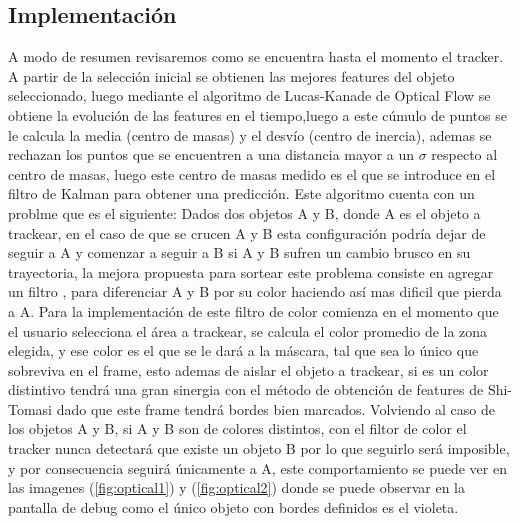 \subsection{Implementación}
 A modo de resumen revisaremos como se encuentra hasta el momento el tracker. A partir de la selección inicial se obtienen las mejores features del objeto seleccionado, luego mediante el algoritmo de Lucas-Kanade de Optical Flow se obtiene la evolución de las features en el tiempo,luego a este cúmulo de puntos se le calcula la media (centro de masas) y el desvío (centro de inercia), ademas se rechazan los puntos que se encuentren a una distancia mayor a un $\sigma$ respecto al centro de masas, luego este centro de masas medido es el que se introduce en el filtro de Kalman para obtener una predicción.
Este algoritmo cuenta con un problme que es el siguiente: Dados dos objetos A y B, donde A es el objeto a trackear, en el caso de que se crucen A y B esta configuración podría dejar de seguir a A y comenzar a seguir a B si A  y B sufren un cambio brusco en su trayectoria, la mejora propuesta para sortear este problema consiste en agregar un filtro , para diferenciar A y B por su color haciendo así mas dificil que pierda a A. Para la implementación de este filtro de color comienza en el momento que el usuario selecciona el área a trackear, se calcula el color promedio de la zona elegida, y ese color es el que se le dará a la máscara, tal que sea lo único que sobreviva en el frame, esto ademas de aislar el objeto a trackear, si es un color distintivo tendrá una gran sinergia con el método de obtención de features de Shi-Tomasi dado que este frame tendrá bordes bien marcados.
Volviendo al caso de los objetos A y B, si A y B son de colores distintos, con el filtor de color el tracker nunca detectará que existe un objeto B por lo que seguirlo será imposible, y por consecuencia seguirá únicamente a A, este comportamiento se puede ver en las imagenes (\ref{fig:optical1}) y (\ref{fig:optical2}) donde se puede observar en la pantalla de debug como el único objeto con bordes definidos es el violeta.



